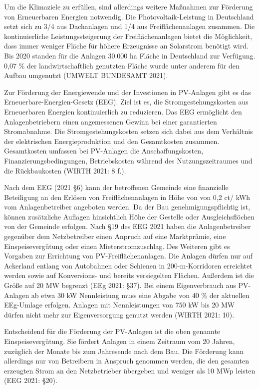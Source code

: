 \documentclass[11pt]{scrartcl}
\begin{document}
Um die Klimaziele zu erfüllen, sind allerdings weitere Maßnahmen zur Förderung von Erneuerbaren Energien notwendig.
Die Photovoltaik-Leistung in Deutschland setzt sich zu 3/4 aus Dachanlagen und 1/4 aus Freiflächenanlagen zusammen.
Die kontinuierliche Leistungssteigerung der Freiflächenanlagen bietet die Möglichkeit, dass immer weniger Fläche für höhere Erzeugnisse an Solarstrom benötigt wird.
Bis 2020 standen für die Anlagen 30.000 ha Fläche in Deutschland zur Verfügung.
0,07 \% der landwirtschaftlich genutzten Fläche wurde unter anderem für den Aufbau umgenutzt (UMWELT BUNDESAMT 2021).

Zur Förderung der Energiewende und der Investionen in PV-Anlagen gibt es das Erneuerbare-Energien-Gesetz (EEG).
Ziel ist es, die Stromgestehungskosten aus Erneuerbaren Energien kontinuierlich zu reduzieren.
Das EEG ermöglicht den Anlagenbetriebern einen angemessenen Gewinn bei einer garantierten Stromabnahme.
Die Stromgestehungskosten setzen sich dabei aus dem Verhältnis der elektrischen Energieproduktion und den Gesamtkosten zusammen.
Gesamtkosten umfassen bei PV-Anlagen die Anschaffungskosten, Finanzierungsbedingungen, Betriebskosten während des Nutzungszeitraumes und die Rückbaukosten (WIRTH 2021: 8 f.).

Nach dem EEG (2021 §6) kann der betroffenen Gemeinde eine finanzielle Beteiligung an den Erlösen von Freiflächenanlagen in Höhe von von 0,2 ct/ kWh vom Anlagenbetreiber angeboten werden.
Da der Bau genehmigungspflichtig ist, können zusätzliche Auflagen hinsichtlich Höhe der Gestelle oder Ausgleichsflöchen von der Gemeinde erfolgen.
Nach §19 des EEG 2021 haben die Anlagenbetreiber gegenüber dem Netzbetreiber einen Anpruch auf eine Marktprämie, eine Einspeisevergütung oder einen Mieterstromzuschlag.
Des Weiteren gibt es Vorgaben zur Errichtung von PV-Freiflächenanlagen.
Die Anlagen dürfen nur auf Ackerland entlang von Autobahnen oder Schienen in 200-m-Korridoren erreichtet werden sowie auf Konversions- und bereits versiegelten Flächen.
Außerdem ist die Größe auf 20 MW begrenzt (EEg 2021: §37).
Bei einem Eigenverbrauch aus PV-Anlagen ab etwa 30 kW Nennleistung muss eine Abgabe von 40 \% der aktuellen EEg-Umlage erfolgen.
Anlagen mit Nennleistungen von 750 kW bis 20 MW dürfen nicht mehr zur Eigenversorgung genutzt werden (WIRTH 2021: 10).

Entscheidend für die Förderung der PV-Anlagen ist die oben genannte Einspeisevergütung.
Sie fördert Anlagen in einem Zeitraum vom 20 Jahren, zuzüglich der Monate bis zum Jahresende nach dem Bau.
Die Förderung kann allerdings nur von Betreibern in Anspruch genommen werden, die den gesamten erzeugten Strom an den Netzbetrieber übergeben und weniger als 10 MWp leisten (EEG 2021: §20).
\end{document}
